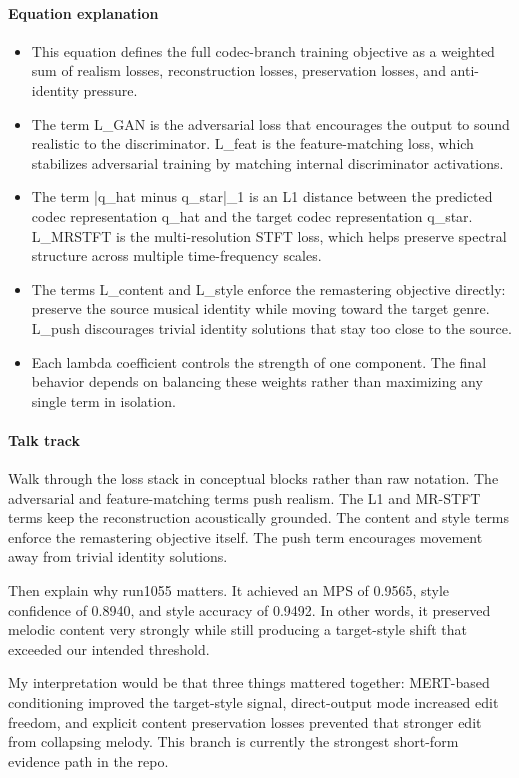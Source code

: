 \documentclass[11pt]{article}
\begin{document}
\paragraph{Equation explanation}
\begin{itemize}
\item This equation defines the full codec-branch training objective as a weighted sum of realism losses, reconstruction losses, preservation losses, and anti-identity pressure.
\item The term L\_GAN is the adversarial loss that encourages the output to sound realistic to the discriminator. L\_feat is the feature-matching loss, which stabilizes adversarial training by matching internal discriminator activations.
\item The term |q\_hat minus q\_star|\_1 is an L1 distance between the predicted codec representation q\_hat and the target codec representation q\_star. L\_MRSTFT is the multi-resolution STFT loss, which helps preserve spectral structure across multiple time-frequency scales.
\item The terms L\_content and L\_style enforce the remastering objective directly: preserve the source musical identity while moving toward the target genre. L\_push discourages trivial identity solutions that stay too close to the source.
\item Each lambda coefficient controls the strength of one component. The final behavior depends on balancing these weights rather than maximizing any single term in isolation.
\end{itemize}
\paragraph{Talk track}
Walk through the loss stack in conceptual blocks rather than raw notation. The adversarial and feature-matching terms push realism. The L1 and MR-STFT terms keep the reconstruction acoustically grounded. The content and style terms enforce the remastering objective itself. The push term encourages movement away from trivial identity solutions.

Then explain why run1055 matters. It achieved an MPS of 0.9565, style confidence of 0.8940, and style accuracy of 0.9492. In other words, it preserved melodic content very strongly while still producing a target-style shift that exceeded our intended threshold.

My interpretation would be that three things mattered together: MERT-based conditioning improved the target-style signal, direct-output mode increased edit freedom, and explicit content preservation losses prevented that stronger edit from collapsing melody. This branch is currently the strongest short-form evidence path in the repo.
\end{document}
